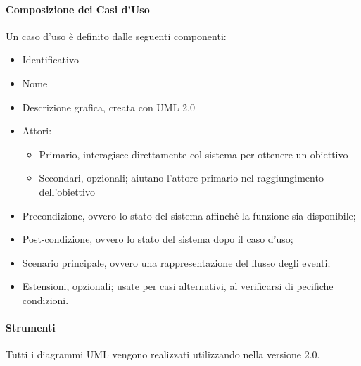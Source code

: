 \paragraph{Composizione dei Casi d'Uso} \hfill \break
Un caso d'uso è definito dalle seguenti componenti: 
\begin{itemize}
  \item Identificativo
  \item Nome
  \item Descrizione grafica, creata con UML 2.0
  \item Attori:
  \begin{itemize}
    \item Primario, interagisce direttamente col sistema per ottenere un obiettivo
    \item Secondari, opzionali; aiutano l'attore primario nel raggiungimento dell'obiettivo
  \end{itemize}
    \item Precondizione, ovvero lo stato del sistema affinché la funzione sia disponibile;
    \item Post-condizione, ovvero lo stato del sistema dopo il caso d'uso;
    \item Scenario principale, ovvero una rappresentazione del flusso degli eventi;
    \item Estensioni, opzionali; usate per casi alternativi, al verificarsi di pecifiche condizioni.
  \end{itemize}
  
\paragraph{Strumenti} \hfill \break
Tutti i diagrammi UML vengono realizzati utilizzando  nella versione 2.0.


